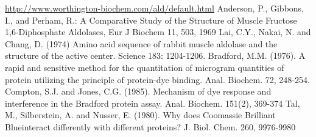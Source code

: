 \begin{thebibliography}{WW}
 \url{http://www.worthington-biochem.com/ald/default.html}
 Anderson, P., Gibbons, I., and Perham, R.:
    A Comparative Study of the Structure of Muscle Fructose 1,6-Diphosphate Aldolases,
    Eur J Biochem 11, 503, 1969
  Lai, C.Y., Nakai, N. and Chang, D. (1974)
    Amino acid sequence of rabbit muscle aldolase and the structure of the active center.
    Science 183: 1204-1206.
 Bradford, M.M. (1976).
    A rapid and sensitive method for the quantitation of microgram quantities of
    protein utilizing the principle of protein-dye binding. Anal. Biochem. 72, 248-254.
 Compton, S.J. and Jones, C.G. (1985).
    Mechanism of dye response and interference in the Bradford protein assay.
    Anal. Biochem. 151(2), 369-374
 Tal, M., Silberstein, A. and Nusser, E. (1980).
    Why does Coomassie Brilliant Blue\textregistered interact differently with different proteins?
    J. Biol. Chem. 260, 9976-9980
\end{thebibliography}


